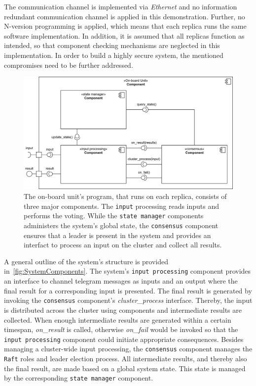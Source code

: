 The communication channel is implemented via \textit{Ethernet} and no information redundant communication channel is applied in this demonstration.
Further, no N-version programming is applied, which means that each replica runs the same software implementation.
In addition, it is assumed that all replicas function as intended, so that component checking mechanisms are neglected in this implementation.
In order to build a highly secure system, the mentioned compromises need to be further addressed.

\begin{figure}[!hb]
	\centering
	\includegraphics[width=0.9\linewidth]{images/Components}
	\caption{The on-board unit's program, that runs on each replica, consists of three major components. The \texttt{input} processing reads inputs and performs the voting. While the \texttt{state manager} components administers the system's global state, the \texttt{consensus} component ensures that a leader is present in the system and provides an interfact to process an input on the cluster and collect all results.}
	\label{fig:SystemComponents}
\end{figure}

A general outline of the system's structure is provided in~\autoref{fig:SystemComponents}.
The system's \texttt{input processing} component provides an interface to channel telegram messages as inputs and an output where the final result for a corresponding input is presented.
The final result is generated by invoking the \texttt{consensus} component's \textit{cluster\_process} interface.
Thereby, the input is distributed across the cluster using  components and intermediate results are collected.
When enough intermediate results are generated within a certain timespan, \textit{on\_result} is called, otherwise \textit{on\_fail} would be invoked so that the \texttt{input processing} component could initiate appropriate consequences.
Besides managing a cluster-wide input processing, the \texttt{consensus} component manages the \texttt{Raft} roles and leader election process.
All intermediate results, and thereby also the final result, are made based on a global system state.
This state is managed by the corresponding \texttt{state manager} component.

